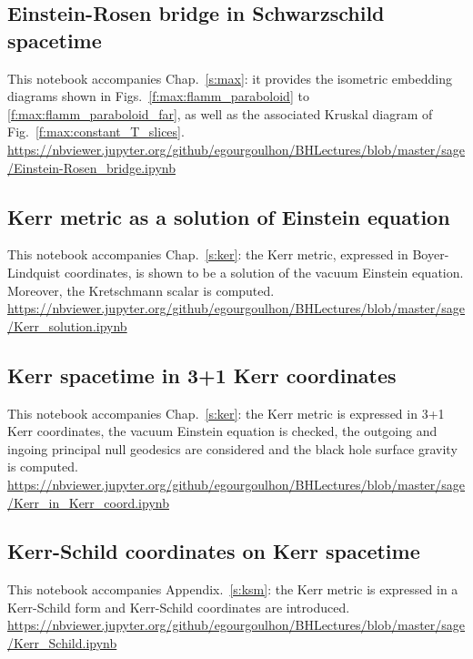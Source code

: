 \subsection{Einstein-Rosen bridge in Schwarzschild spacetime}
\label{s:sam:Einstein-Rosen}
This notebook accompanies Chap.~\ref{s:max}: it provides the
isometric embedding diagrams shown in Figs.~\ref{f:max:flamm_paraboloid}
to \ref{f:max:flamm_paraboloid_far}, as well as the associated
Kruskal diagram of Fig.~\ref{f:max:constant_T_slices}.\\[1ex]
{\footnotesize
\url{https://nbviewer.jupyter.org/github/egourgoulhon/BHLectures/blob/master/sage/Einstein-Rosen_bridge.ipynb}
}


\subsection{Kerr metric as a solution of Einstein equation} \label{s:sam:Kerr_solution}

This notebook accompanies Chap.~\ref{s:ker}: the Kerr metric, expressed in Boyer-Lindquist
coordinates, is shown to be a solution of the vacuum Einstein equation. Moreover, the Kretschmann scalar is computed.\\[1ex]
{\footnotesize
\url{https://nbviewer.jupyter.org/github/egourgoulhon/BHLectures/blob/master/sage/Kerr_solution.ipynb}
}

\subsection{Kerr spacetime in 3+1 Kerr coordinates} \label{s:sam:Kerr_Kerr_coord}

This notebook accompanies Chap.~\ref{s:ker}: the Kerr metric is expressed in 3+1 Kerr coordinates, the vacuum Einstein equation is checked, the outgoing and ingoing principal null geodesics are considered and the black hole surface gravity is computed.\\[1ex]
{\footnotesize
\url{https://nbviewer.jupyter.org/github/egourgoulhon/BHLectures/blob/master/sage/Kerr_in_Kerr_coord.ipynb}
}

\subsection{Kerr-Schild coordinates on Kerr spacetime} \label{s:sam:Kerr_Schild}

This notebook accompanies Appendix.~\ref{s:ksm}: the Kerr metric is expressed in
a Kerr-Schild form and Kerr-Schild coordinates are introduced.\\[1ex]
{\footnotesize
\url{https://nbviewer.jupyter.org/github/egourgoulhon/BHLectures/blob/master/sage/Kerr_Schild.ipynb}
}

